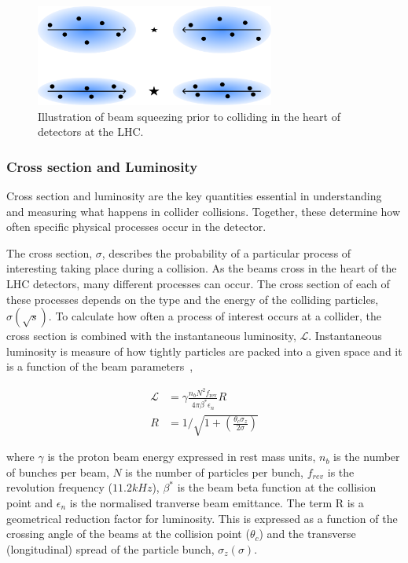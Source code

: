 \begin{figure}[h]
\centering
\includegraphics[width= 0.7\textwidth]{Figures/Chapter3/LHC_BeamSqueeze.pdf}
\caption{Illustration of beam squeezing prior to colliding in the heart of detectors at the LHC.}
\label{Figure:Chapter3_LHC_BeamSqueeze}
\end{figure}

\subsubsection{Cross section and Luminosity}

Cross section and luminosity are the key quantities essential in understanding and measuring what happens in collider collisions. Together, these determine how often specific physical processes occur in the detector.

The cross section, $\sigma$, describes the probability of a particular process of interesting taking place during a collision. As the beams cross in the heart of the LHC detectors, many different processes can occur. The cross section of each of these processes depends on the type and the energy of the colliding particles, $\sigma(\sqrt{s})$. To calculate how often a process of interest occurs at a collider, the cross section is combined with the instantaneous luminosity, $\mathscr{L}$. Instantaneous luminosity is measure of how tightly particles are packed into a given space and it is a function of the beam parameters~\cite{LHC_HL},


\begin{equation}
\begin{aligned}
    \mathscr{L} &= \gamma \frac{n_b N^2 f_{\text{rev}}}{4\pi \beta^* \epsilon_n} R \\
    R &= 1 / \sqrt{1 + \left( \frac{\theta_c \sigma_z}{2\sigma} \right) }
\end{aligned}
\end{equation}

where $\gamma$ is the proton beam energy expressed in rest mass units, $n_b$ is the number of bunches per beam, $N$ is the number of particles per bunch, $f_{rev}$ is the revolution frequency ($11.2\unit{kHz}$), $\beta^*$ is the beam beta function at the collision point and $\epsilon_n$ is the normalised tranverse beam emittance. The term R is a geometrical reduction factor for luminosity. This is expressed as a function of the crossing angle of the beams at the collision point ($\theta_c$) and the transverse (longitudinal) spread of the particle bunch, $\sigma_z(\sigma)$. 

